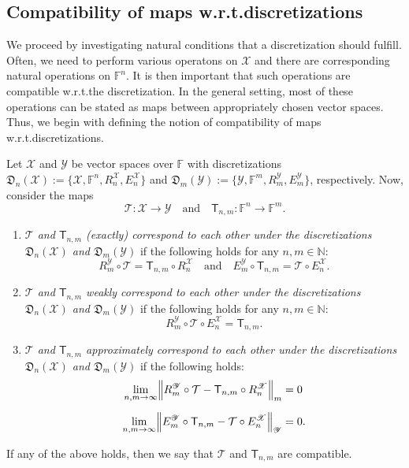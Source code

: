 \documentclass[a4paper]{paper}
\newcommand{\discr}{\mathfrak{D}}
\newcommand{\VecSpace}[1]{\mathscr{#1}}
\newcommand{\Field}{\mathbb{F}}
\newcommand{\Natural}{\mathbb{N}}
\newcommand{\Op}[1]{\mathcal{#1}}
\newcommand{\DiscOp}[1]{\mathsf{#1}}
\newcommand*{\EXT}[2]{\ensuremath{E_{#1}^{#2}}}
\newcommand*{\EnX}{\ensuremath{\EXT{n}{\VecSpace{X}}}}
\begin{document}
\subsection{Compatibility of maps w.r.t.\@ discretizations}
We proceed by investigating natural conditions that a discretization should fulfill. Often, 
we need to perform various operatons on $\VecSpace{X}$ and there are corresponding natural 
operations on $\Field^{n}$. It is then important that such operations are compatible w.r.t.\@ the discretization. 
In the general setting, most of these operations can be stated as maps between appropriately chosen vector 
spaces. Thus, we begin with defining the notion of compatibility of maps w.r.t.\@ discretizations. 
\begin{definition}\label{def:MapComp}
  Let $\VecSpace{X}$ and $\VecSpace{Y}$ be vector spaces over $\Field$ with discretizations 
  $\discr_{n}(\VecSpace{X}):=\{\VecSpace{X}, \Field^{n},R^{\VecSpace{X}}_{n},E^{\VecSpace{X}}_{n} \}$ and 
  $\discr_{m}(\VecSpace{Y}):=\{ \VecSpace{Y}, \Field^{m},R^{\VecSpace{Y}}_{m},E^{\VecSpace{Y}}_{m}\}$,   
  respectively. Now, consider the maps 
  \[  \Op{T} \colon \VecSpace{X} \to \VecSpace{Y}   \quad\text{and}\quad    
      \DiscOp{T}_{n,m} \colon \Field^{n} \to \Field^{m}.   \]
  \begin{enumerate}
  \item \emph{$\Op{T}$ and $\DiscOp{T}_{n,m}$ (exactly) correspond to each 
  other under the discretizations $\discr_{n}(\VecSpace{X})$ and  $\discr_{m}(\VecSpace{Y})$} if 
  the following holds for any $n,m \in \Natural$:
  \[ R^{\VecSpace{Y}}_{m} \circ \Op{T} = \DiscOp{T}_{n,m} \circ R^{\VecSpace{X}}_{n}
     \quad\text{and}\quad
     E^{\VecSpace{Y}}_{m} \circ \DiscOp{T}_{n,m} = \Op{T} \circ E_{n}^{\VecSpace{X}}.
  \]
  \item \emph{$\Op{T}$ and $\DiscOp{T}_{n,m}$ weakly correspond to each 
  other under the discretizations $\discr_{n}(\VecSpace{X})$ and  $\discr_{m}(\VecSpace{Y})$} if 
  the following holds for any $n,m \in \Natural$:
  \[ R^{\VecSpace{Y}}_{m} \circ \Op{T} \circ \EnX = \DiscOp{T}_{n,m}.
  \]
  \item \emph{$\Op{T}$ and $\DiscOp{T}_{n,m}$ approximately correspond to 
  each other under the discretizations $\discr_{n}(\VecSpace{X})$  and  $\discr_{m}(\VecSpace{Y})$}
  if the following holds:
  \begin{align*} 
    \lim_{n,m\to \infty} 
       \Bigl\Vert R_{m}^{\VecSpace{Y}} \circ \Op{T} - \DiscOp{T}_{n,m} \circ R^{\VecSpace{X}}_{n} \Bigr\Vert_{m} &= 0 
     \\[0.5em]
     \lim_{n,m\to \infty} 
       \Bigl\Vert E^{\VecSpace{Y}}_{m} \circ \DiscOp{T}_{n,m} - \Op{T} \circ E_{n}^{\VecSpace{X}} 
       \Bigr\Vert_{\VecSpace{Y}} &= 0.
  \end{align*} 
  \end{enumerate}  
  If any of the above holds, then we say that $\Op{T}$ and $\DiscOp{T}_{n,m}$ are compatible.
\end{definition}
\end{document}

